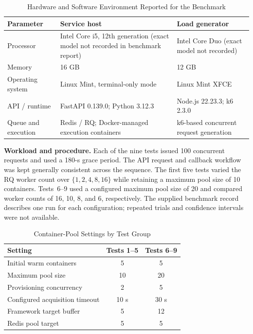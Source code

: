\documentclass[conference]{IEEEtran}
\begin{document}
\begin{table}[t]
\centering
\caption{Hardware and Software Environment Reported for the Benchmark}
\label{tab:environment}
\renewcommand{\arraystretch}{1.12}
\setlength{\tabcolsep}{5pt}
\begin{tabular}{p{}p{}p{}}
\toprule
\textbf{Parameter} & \textbf{Service host} & \textbf{Load generator} \\
\midrule
Processor & Intel Core i5, 12th generation (exact model not recorded in benchmark report) & Intel Core Duo (exact model not recorded) \\
Memory & 16 GB & 12 GB \\
Operating system & Linux Mint, terminal-only mode & Linux Mint XFCE \\
API / runtime & FastAPI 0.139.0; Python 3.12.3 & Node.js 22.23.3; k6 2.3.0 \\
Queue and execution & Redis / RQ; Docker-managed execution containers & k6-based concurrent request generation \\
\bottomrule
\end{tabular}
\end{table}

\textbf{Workload and procedure.} Each of the nine tests issued 100 concurrent requests and used a 180-s grace period. The API request and callback workflow was kept generally consistent across the sequence. The first five tests varied the RQ worker count over $\{1,2,4,8,16\}$ while retaining a maximum pool size of 10 containers. Tests~6--9 used a configured maximum pool size of 20 and compared worker counts of 16, 10, 8, and 6, respectively. The supplied benchmark record describes one run for each configuration; repeated trials and confidence intervals were not available.

\begin{table}[t]
\centering
\caption{Container-Pool Settings by Test Group}
\label{tab:pool-settings}
\renewcommand{\arraystretch}{1.12}
\setlength{\tabcolsep}{3.4pt}
\begin{tabular}{p{}cc}
\toprule
\textbf{Setting} & \textbf{Tests 1--5} & \textbf{Tests 6--9} \\
\midrule
Initial warm containers & 5 & 5 \\
Maximum pool size & 10 & 20 \\
Provisioning concurrency & 2 & 5 \\
Configured acquisition timeout & 10 s & 30 s \\
Framework target buffer & 5 & 12 \\
Redis pool target & 5 & 5 \\
\bottomrule
\end{tabular}
\end{table}
\end{document}
